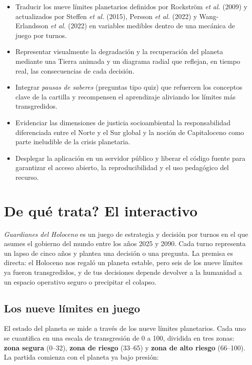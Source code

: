 \documentclass[12pt,a4paper]{article}
\newcommand{\zona}[2]{\textcolor{#1}{\textbf{#2}}}
\begin{document}
\begin{itemize}[leftmargin=1.4em, itemsep=4pt]
  \item Traducir los nueve l\'{i}mites planetarios definidos por Rockstr\"{o}m \textit{et al.} (2009) y actualizados por Steffen \textit{et al.} (2015), Persson \textit{et al.} (2022) y Wang-Erlandsson \textit{et al.} (2022) en variables medibles dentro de una mec\'{a}nica de juego por turnos.
  \item Representar visualmente la degradaci\'{o}n y la recuperaci\'{o}n del planeta mediante una Tierra animada y un diagrama radial que reflejan, en tiempo real, las consecuencias de cada decisi\'{o}n.
  \item Integrar \emph{pausas de saberes} (preguntas tipo quiz) que refuercen los conceptos clave de la cartilla y recompensen el aprendizaje aliviando los l\'{i}mites m\'{a}s transgredidos.
  \item Evidenciar las dimensiones de justicia socioambiental la responsabilidad diferenciada entre el Norte y el Sur global y la noci\'{o}n de Capitaloceno como parte ineludible de la crisis planetaria.
  \item Desplegar la aplicaci\'{o}n en un servidor p\'{u}blico y liberar el c\'{o}digo fuente para garantizar el acceso abierto, la reproducibilidad y el uso pedag\'{o}gico del recurso.
\end{itemize}

\section*{\textquestiondown De qu\'{e} trata? El interactivo}

\emph{Guardianes del Holoceno} es un juego de estrategia y decisi\'{o}n por turnos en el que asumes el gobierno del mundo entre los a\~{n}os 2025 y 2090. Cada turno representa un lapso de cinco a\~{n}os y plantea una decisi\'{o}n o una pregunta. La premisa es directa: el Holoceno nos regal\'{o} un planeta estable, pero seis de los nueve l\'{i}mites ya fueron transgredidos, y de tus decisiones depende devolver a la humanidad a un espacio operativo seguro o precipitar el colapso.

\subsection*{Los nueve l\'{i}mites en juego}

El estado del planeta se mide a trav\'{e}s de los nueve l\'{i}mites planetarios. Cada uno se cuantifica en una escala de transgresi\'{o}n de 0 a 100, dividida en tres zonas: \zona{segura}{zona segura} (0--32), \zona{riesgo}{zona de riesgo} (33--65) y \zona{alto}{zona de alto riesgo} (66--100). La partida comienza con el planeta ya bajo presi\'{o}n:
\end{document}
